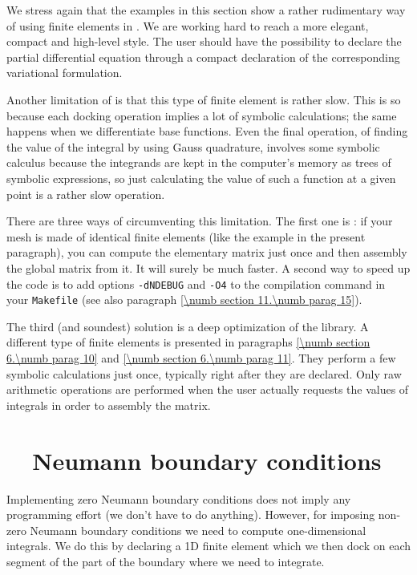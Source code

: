 We stress again that the examples in this section show a rather rudimentary way of
using finite elements in \maniFEM.
We are working hard to reach a more elegant, compact and high-level style.
The user should have the possibility to declare the partial differential equation
through a compact declaration of the corresponding variational formulation.

Another limitation of {\maniFEM} is that this type of finite element is rather slow.
This is so because each docking operation implies a lot of symbolic calculations;
the same happens when we differentiate base functions.
Even the final operation, of finding the value of the integral by using Gauss quadrature,
involves some symbolic calculus because the integrands are kept in the computer's memory
as trees of symbolic expressions, so just calculating the value of such a function at a given point
is a rather slow operation.

There are three ways of circumventing this limitation.
The first one is : if your mesh is made of identical finite elements
(like the example in the present paragraph), you can compute the elementary matrix
just once and then assembly the global matrix from it.
It will surely be much faster.
A second way to speed up the code is to add options {\small\tt -dNDEBUG} and {\small\tt -O4}
to the compilation command in your {\small\tt Makefile}
(see also paragraph \ref{\numb section 11.\numb parag 15}).

The third (and soundest) solution is a deep optimization of the {\maniFEM} library.
A different type of finite elements is presented in paragraphs
\ref{\numb section 6.\numb parag 10} and \ref{\numb section 6.\numb parag 11}.
They perform a few symbolic calculations just once, typically right after they are declared.
Only raw arithmetic operations are performed when the user actually requests the values
of integrals in order to assembly the matrix.


\section{~~Neumann boundary conditions}\label{\numb section 6.\numb parag 4}

Implementing zero Neumann boundary conditions does not imply any programming effort
(we don't have to do anything).
However, for imposing non-zero Neumann boundary conditions we need to compute one-dimensional
integrals.
We do this by declaring a 1D finite element which we then dock on each segment of the
part of the boundary where we need to integrate.

